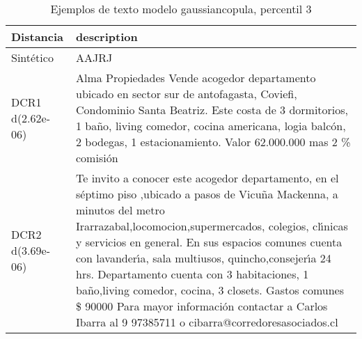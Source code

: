\begin{table}[H]
\centering
\fontsize{10}{14}\selectfont
\caption{Ejemplos de texto modelo gaussiancopula, percentil 3}
\label{table-example-economicos-a-2-gaussiancopula-3p-text}
\begin{tabular}{|l|m{35em}|}
\hline
\rowcolor[gray]{0.8}
Distancia & description \\
\hline Sintético & AAJRJ \\
\hline DCR1 d(2.62e-06) & Alma Propiedades Vende acogedor departamento ubicado en sector sur de antofagasta, Coviefi, Condominio Santa Beatriz. Este costa de 3 dormitorios, 1 ba\~no, living comedor, cocina americana, logia balc\'on, 2 bodegas, 1 estacionamiento. Valor 62.000.000 mas 2 \% comisi\'on \\
\hline DCR2 d(3.69e-06) & Te invito a conocer este acogedor departamento, en el s\'eptimo piso ,ubicado a pasos de Vicu\~na Mackenna, a minutos del metro Irarrazabal,locomocion,supermercados, colegios, cl{\'\i}nicas y servicios en general.
 En sus espacios comunes cuenta con lavander{\'\i}a, sala multiusos, quincho,consejer{\'\i}a 24 hrs. Departamento cuenta con 3 habitaciones, 1 ba\~no,living comedor, cocina, 3 closets.
 Gastos comunes \$ 90000 Para mayor informaci\'on contactar a Carlos Ibarra al 9 97385711 o cibarra@corredoresasociados.cl \\
\hline
\end{tabular}
\end{table}
